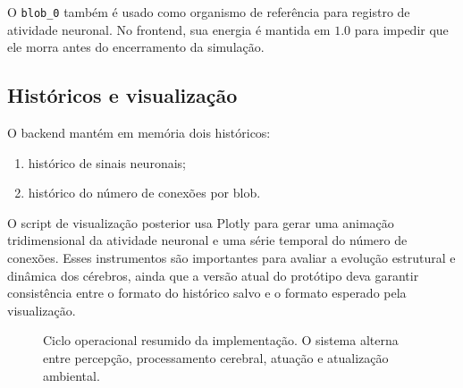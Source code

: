 \documentclass[12pt,a4paper,fleqn]{article}
\begin{document}
O \texttt{blob\_0} também é usado como organismo de referência para registro de atividade neuronal. No frontend, sua energia é mantida em $1.0$ para impedir que ele morra antes do encerramento da simulação.

\subsection{Históricos e visualização}

O backend mantém em memória dois históricos:

\begin{enumerate}
	\item histórico de sinais neuronais;
	\item histórico do número de conexões por blob.
\end{enumerate}

O script de visualização posterior usa Plotly para gerar uma animação tridimensional da atividade neuronal e uma série temporal do número de conexões. Esses instrumentos são importantes para avaliar a evolução estrutural e dinâmica dos cérebros, ainda que a versão atual do protótipo deva garantir consistência entre o formato do histórico salvo e o formato esperado pela visualização.

\begin{figure}[H]
\centering
{}
\caption{Ciclo operacional resumido da implementação. O sistema alterna entre percepção, processamento cerebral, atuação e atualização ambiental.}
\label{fig:ciclo-operacional}
\end{figure}
\end{document}

